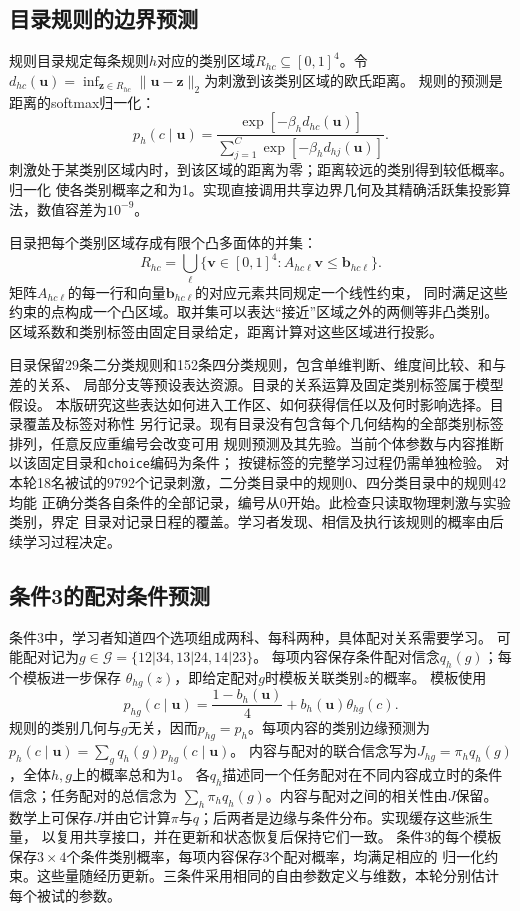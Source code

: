 \documentclass[11pt,a4paper]{article}
\numberwithin{equation}{section}
\begin{document}
\subsection{目录规则的边界预测}
规则目录规定每条规则$h$对应的类别区域$R_{hc}\subseteq[0,1]^4$。令
$d_{hc}(\bm u)=\inf_{\bm z\in R_{hc}}\|\bm u-\bm z\|_2$为刺激到该类别区域的欧氏距离。
规则的预测是距离的softmax归一化：
\begin{equation}
p_h(c\mid\bm u)=\frac{\exp[-\beta_h d_{hc}(\bm u)]}
{\sum_{j=1}^C\exp[-\beta_h d_{hj}(\bm u)]}.
\label{eq:rule-prediction}
\end{equation}
刺激处于某类别区域内时，到该区域的距离为零；距离较远的类别得到较低概率。归一化
使各类别概率之和为1。实现直接调用共享边界几何及其精确活跃集投影算法，数值容差为$10^{-9}$。

目录把每个类别区域存成有限个凸多面体的并集：
\begin{equation}
R_{hc}=\bigcup_{\ell}\{\bm v\in[0,1]^4:A_{hc\ell}\bm v\leq\bm b_{hc\ell}\}.
\label{eq:catalogue-regions}
\end{equation}
矩阵$A_{hc\ell}$的每一行和向量$\bm b_{hc\ell}$的对应元素共同规定一个线性约束，
同时满足这些约束的点构成一个凸区域。取并集可以表达“接近”区域之外的两侧等非凸类别。
区域系数和类别标签由固定目录给定，距离计算对这些区域进行投影。

目录保留29条二分类规则和152条四分类规则，包含单维判断、维度间比较、和与差的关系、
局部分支等预设表达资源。目录的关系运算及固定类别标签属于模型假设。
本版研究这些表达如何进入工作区、如何获得信任以及何时影响选择。目录覆盖及标签对称性
另行记录。现有目录没有包含每个几何结构的全部类别标签排列，任意反应重编号会改变可用
规则预测及其先验。当前个体参数与内容推断以该固定目录和\texttt{choice}编码为条件；
按键标签的完整学习过程仍需单独检验。
对本轮18名被试的9792个记录刺激，二分类目录中的规则0、四分类目录中的规则42均能
正确分类各自条件的全部记录，编号从0开始。此检查只读取物理刺激与实验类别，界定
目录对记录日程的覆盖。学习者发现、相信及执行该规则的概率由后续学习过程决定。

\subsection{条件3的配对条件预测}
条件3中，学习者知道四个选项组成两科、每科两种，具体配对关系需要学习。
可能配对记为$g\in\mathcal G=\{12|34,13|24,14|23\}$。
每项内容保存条件配对信念$q_h(g)$；每个模板进一步保存
$\theta_{hg}(z)$，即给定配对$g$时模板关联类别$z$的概率。
模板使用
\begin{equation}
p_{hg}(c\mid\bm u)=\frac{1-b_h(\bm u)}4+b_h(\bm u)\theta_{hg}(c).
\label{eq:conditional-template}
\end{equation}
规则的类别几何与$g$无关，因而$p_{hg}=p_h$。每项内容的类别边缘预测为
$p_h(c\mid\bm u)=\sum_gq_h(g)p_{hg}(c\mid\bm u)$。
内容与配对的联合信念写为$J_{hg}=\pi_hq_h(g)$，全体$h,g$上的概率总和为1。
各$q_h$描述同一个任务配对在不同内容成立时的条件信念；任务配对的总信念为
$\sum_h\pi_hq_h(g)$。内容与配对之间的相关性由$J$保留。
数学上可保存$J$并由它计算$\pi$与$q$；后两者是边缘与条件分布。实现缓存这些派生量，
以复用共享接口，并在更新和状态恢复后保持它们一致。
条件3的每个模板保存$3\times4$个条件类别概率，每项内容保存3个配对概率，均满足相应的
归一化约束。这些量随经历更新。三条件采用相同的自由参数定义与维数，本轮分别估计
每个被试的参数。
\end{document}
